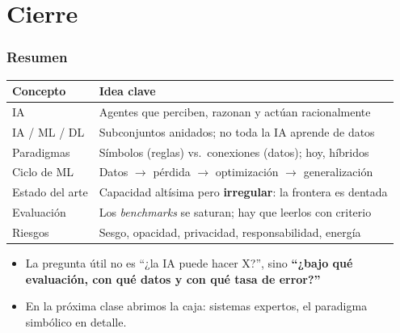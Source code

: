\documentclass[aspectratio=169, 10pt]{beamer}
\begin{document}
\section{Cierre}

\begin{frame}
\frametitle{Resumen}
\begin{center}
\begin{tabular}{ll}
\toprule
\textbf{Concepto} & \textbf{Idea clave}\\
\midrule
IA                & Agentes que perciben, razonan y act\'uan racionalmente\\
IA / ML / DL      & Subconjuntos anidados; no toda la IA aprende de datos\\
Paradigmas        & S\'imbolos (reglas) vs.\ conexiones (datos); hoy, h\'ibridos\\
Ciclo de ML       & Datos $\rightarrow$ p\'erdida $\rightarrow$ optimizaci\'on $\rightarrow$ generalizaci\'on\\
Estado del arte   & Capacidad alt\'isima pero \textbf{irregular}: la frontera es dentada\\
Evaluaci\'on      & Los \emph{benchmarks} se saturan; hay que leerlos con criterio\\
Riesgos           & Sesgo, opacidad, privacidad, responsabilidad, energ\'ia\\
\bottomrule
\end{tabular}
\end{center}
\vspace{0.8em}
\begin{itemize}
	\item La pregunta \'util no es ``¿la IA puede hacer X?'', sino \textbf{``¿bajo qu\'e evaluaci\'on, con qu\'e datos y con qu\'e tasa de error?''}
	\item En la pr\'oxima clase abrimos la caja: sistemas expertos, el paradigma simb\'olico en detalle.
\end{itemize}
\end{frame}
\end{document}

